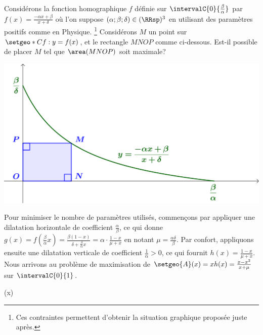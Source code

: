 Considérons la fonction homographique $f$ définie sur $\intervalC{0}{\frac{\beta}{\alpha}}$ par $f(x) = \frac{- \alpha x + \beta}{x + \delta}$ où l'on suppose $(\alpha ; \beta ; \delta) \in (\RRsp)^3$ en utilisant des paramètres positifs comme en Physique.%
\footnote{
    Ces contraintes permettent d'obtenir la situation graphique proposée juste après.
}
%
Considérons $M$ un point sur $\setgeo*{C}{f}: y = f(x)$, et le rectangle $MNOP$ comme ci-dessous. Est-il possible de placer $M$ tel que $\area(MNOP)$ soit maximale?

\smallskip

\begin{center}
    \includegraphics[scale=.67]{goal.png}
\end{center}




Pour minimiser le nombre de paramètres utilisés,
commençons par appliquer une dilatation horizontale de coefficient $\frac{\alpha}{\beta}$,
ce qui donne
$g(x) = f( \frac{\beta}{\alpha} x )
      = \frac{\beta(1 - x)}{\delta + \frac{\beta}{\alpha} x}
      = \alpha \cdot \frac{1 - x}{\mu + x}$
en notant $\mu = \frac{\alpha \delta}{\beta}$.
Par confort,
appliquons ensuite une dilatation verticale de coefficient $\frac{1}{\alpha} > 0$,
ce qui fournit
$h(x) = \frac{1 - x}{\mu + x}$.
%
Nous arrivons au problème de maximisation de
$\setgeo{A}(x) = x h(x) = \frac{x - x^2}{x + \mu}$
sur $\intervalC{0}{1}$.

\begin{stepcalc}[style=sar]
    (x)
\explnext{}
\explnext{}
\end{stepcalc}

\smallskip

